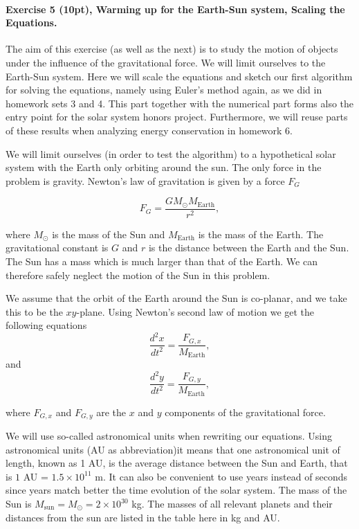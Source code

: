 \documentclass[%
oneside,                 %
final,                   %
10pt]{article}
\begin{document}
\paragraph{Exercise 5 (10pt), Warming up for the Earth-Sun system, Scaling the Equations.}
The aim of this exercise (as well as the next) is to study the motion
of objects under the influence of the gravitational force.  We will
limit ourselves to the Earth-Sun system. Here we will scale the
equations and sketch our first algorithm for solving the equations,
namely using Euler's method again, as we did in homework sets 3 and 4.  This part
together with the numerical part forms also the entry point for the
solar system honors project. Furthermore, we will reuse parts of these
results when analyzing energy conservation in homework 6.

We will limit ourselves (in order to test the algorithm) to a
hypothetical solar system with the Earth only orbiting around the sun.
The only force in the problem is gravity. Newton's law of gravitation
is given by a force $F_G$

\[
F_G=\frac{GM_{\odot}M_{\mathrm{Earth}}}{r^2},
\]

where $M_{\odot}$ is the mass of the Sun and $M_{\mathrm{Earth}}$ is
the mass of the Earth. The gravitational constant is $G$ and $r$ is
the distance between the Earth and the Sun.  The Sun
has a mass which is much larger than that of the Earth. We can
therefore safely neglect the motion of the Sun in this problem.


We assume that the orbit of the Earth around the Sun 
is co-planar, and we take this to be the $xy$-plane.
Using Newton's second law of motion we get the following equations
\[
\frac{d^2x}{dt^2}=\frac{F_{G,x}}{M_{\mathrm{Earth}}},
\]
and
\[
\frac{d^2y}{dt^2}=\frac{F_{G,y}}{M_{\mathrm{Earth}}},
\]

where $F_{G,x}$ and $F_{G,y}$ are the $x$ and $y$ components of the
gravitational force.

We will use so-called astronomical units when rewriting our equations.
Using astronomical units (AU as abbreviation)it means that one
astronomical unit of length, known as 1 AU, is the average distance
between the Sun and Earth, that is $1$ AU = $1.5\times 10^{11}$ m.  It
can also be convenient to use years instead of seconds since years
match better the time evolution of the solar system. The mass of the
Sun is $M_{\mathrm{sun}}=M_{\odot}=2\times 10^{30}$ kg. The masses of
all relevant planets and their distances from the sun are listed in
the table here in kg and AU.
\end{document}
